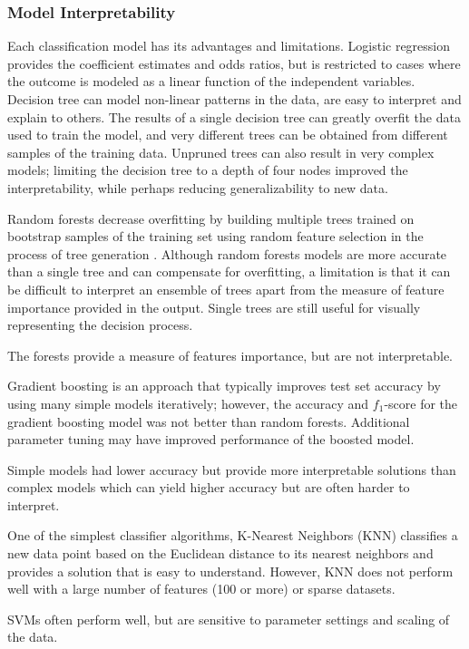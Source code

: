 \documentclass[sigconf]{acmart}
\begin{document}
\subsubsection{Model Interpretability}

Each classification model has its advantages and limitations. Logistic 
regression provides the coefficient estimates and odds ratios, but is 
restricted to cases where the outcome is modeled as a linear function of 
the independent variables. Decision tree can model non-linear patterns in 
the data, are easy to interpret and explain to others. The results of a 
single decision tree can greatly overfit the data used to train the model, 
and very different trees can be obtained from different samples of the 
training data. Unpruned trees can also result in very complex models; 
limiting the decision tree to a depth of four nodes improved the 
interpretability, while perhaps reducing generalizability to new data. 

Random forests decrease overfitting by building multiple trees trained on
bootstrap samples of the training set using random feature selection in the
process of tree generation \cite{brown12}. Although random forests models are
more accurate than a single tree and can compensate for overfitting, a 
limitation is that it can be difficult to interpret an ensemble of trees apart 
from the measure of feature importance provided in the output. Single trees 
are still useful for visually representing the decision process.

The forests provide a measure of features importance, but are not interpretable.

Gradient boosting is an approach that typically improves test set accuracy by 
using many simple models iteratively; however, the accuracy and $f_1$-score for 
the gradient boosting model was not better than random forests. Additional 
parameter tuning may have improved performance of the boosted model.


Simple models had lower accuracy but provide more interpretable solutions 
than complex models which can yield higher accuracy but are often harder 
to interpret. 

One of the simplest classifier algorithms, K-Nearest Neighbors (KNN)
classifies a new data point based on the Euclidean distance to its 
nearest neighbors and provides a solution that is easy to understand. 
However, KNN does not perform well with a large number of features 
(100 or more) or sparse datasets.

SVMs often perform well, but are sensitive to parameter settings 
and scaling of the data. 
\end{document}
